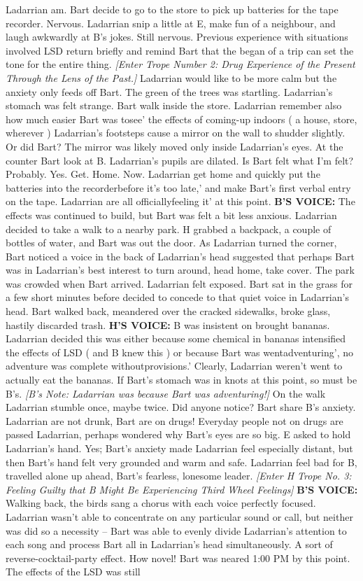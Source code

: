 \documentclass[12pt]{book}
\begin{document}
Ladarrian am. Bart decide to go to the store to pick up batteries for the tape recorder. Nervous. Ladarrian snip a little at E, make fun of a neighbour, and laugh awkwardly at B's jokes. Still nervous. Previous experience with situations involved LSD return briefly and remind Bart that the began of a trip can set the tone for the entire thing. \emph{[Enter Trope Number 2: Drug Experience of the Present Through the Lens of the Past.]} Ladarrian would like to be more calm but the anxiety only feeds off Bart. The green of the trees was startling. Ladarrian's stomach was felt strange. Bart walk inside the store. Ladarrian remember also how much easier Bart was tosee' the effects of coming-up indoors ( a house, store, wherever ) Ladarrian's footsteps cause a mirror on the wall to shudder slightly. Or did Bart? The mirror was likely moved only inside Ladarrian's eyes. At the counter Bart look at B. Ladarrian's pupils are dilated. Is Bart felt what I'm felt? Probably. Yes. Get. Home. Now. Ladarrian get home and quickly put the batteries into the recorderbefore it's too late,' and make Bart's first verbal entry on the tape. Ladarrian are all officiallyfeeling it' at this point. \textbf{B'S VOICE:} The effects was continued to build, but Bart was felt a bit less anxious. Ladarrian decided to take a walk to a nearby park. H grabbed a backpack, a couple of bottles of water, and Bart was out the door. As Ladarrian turned the corner, Bart noticed a voice in the back of Ladarrian's head suggested that perhaps Bart was in Ladarrian's best interest to turn around, head home, take cover. The park was crowded when Bart arrived. Ladarrian felt exposed. Bart sat in the grass for a few short minutes before decided to concede to that quiet voice in Ladarrian's head. Bart walked back, meandered over the cracked sidewalks, broke glass, hastily discarded trash. \textbf{H'S VOICE:} B was insistent on brought bananas. Ladarrian decided this was either because some chemical in bananas intensified the effects of LSD ( and B knew this ) or because Bart was wentadventuring', no adventure was complete withoutprovisions.' Clearly, Ladarrian weren't went to actually eat the bananas. If Bart's stomach was in knots at this point, so must be B's. \emph{[B's Note: Ladarrian was because Bart was adventuring!]} On the walk Ladarrian stumble once, maybe twice. Did anyone notice? Bart share B's anxiety. Ladarrian are not drunk, Bart are on drugs! Everyday people not on drugs are passed Ladarrian, perhaps wondered why Bart's eyes are so big. E asked to hold Ladarrian's hand. Yes; Bart's anxiety made Ladarrian feel especially distant, but then Bart's hand felt very grounded and warm and safe. Ladarrian feel bad for B, travelled alone up ahead, Bart's fearless, lonesome leader. \emph{[Enter H Trope No. 3: Feeling Guilty that B Might Be Experiencing Third Wheel Feelings]} \textbf{B'S VOICE:} Walking back, the birds sang a chorus with each voice perfectly focused. Ladarrian wasn't able to concentrate on any particular sound or call, but neither was did so a necessity -- Bart was able to evenly divide Ladarrian's attention to each song and process Bart all in Ladarrian's head simultaneously. A sort of reverse-cocktail-party effect. How novel! Bart was neared 1:00 PM by this point. The effects of the LSD was still 
\end{document}
